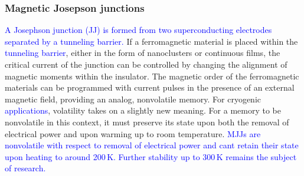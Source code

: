 \documentclass[twocolumn]{article}
\begin{document}
\subsubsection{Magnetic Josepson junctions}
\textcolor{blue}{A Josephson junction (JJ) is formed from two superconducting electrodes separated by a tunneling barrier.} If a ferromagnetic material is placed within the \textcolor{blue}{tunneling barrier}, either in the form of nanoclusters or continuous films, the critical current of the junction can be controlled by changing the alignment of magnetic moments within the insulator. The magnetic order of the ferromagnetic materials can be programmed with current pulses in the presence of an external magnetic field, providing an analog, nonvolatile memory. For cryogenic \textcolor{blue}{applications}, volatility takes on a slightly new meaning. For a memory to be nonvolatile in this context, it must preserve its state upon both the removal of electrical power and upon warming up to room temperature. \textcolor{blue}{MJJs are nonvolatile with respect to removal of electrical power and cant retain their state upon heating to around 200\,K. Further stability up to 300\,K remains the subject of research.} 
\end{document}
